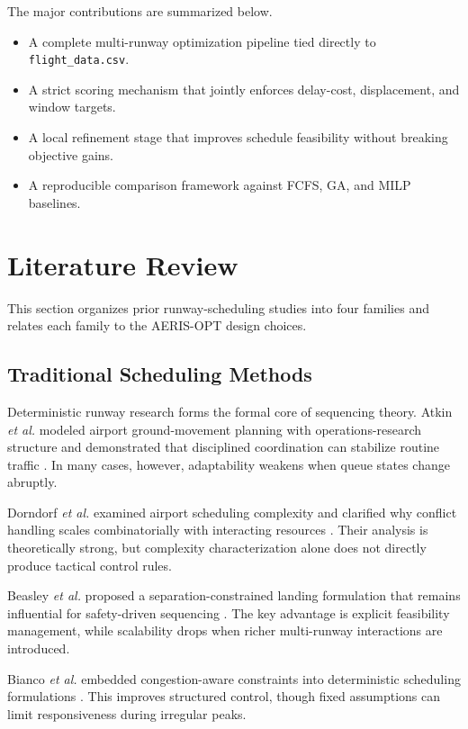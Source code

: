 \documentclass[conference]{IEEEtran}
\begin{document}
The major contributions are summarized below.
\begin{itemize}
    \item A complete multi-runway optimization pipeline tied directly to \texttt{flight\_data.csv}.
    \item A strict scoring mechanism that jointly enforces delay-cost, displacement, and window targets.
    \item A local refinement stage that improves schedule feasibility without breaking objective gains.
    \item A reproducible comparison framework against FCFS, GA, and MILP baselines.
\end{itemize}

\section{Literature Review}
This section organizes prior runway-scheduling studies into four families and relates each family to the AERIS-OPT design choices.

\subsection{Traditional Scheduling Methods}
Deterministic runway research forms the formal core of sequencing theory. Atkin \textit{et al.} modeled airport ground-movement planning with operations-research structure and demonstrated that disciplined coordination can stabilize routine traffic \cite{ref1}. In many cases, however, adaptability weakens when queue states change abruptly.

Dorndorf \textit{et al.} examined airport scheduling complexity and clarified why conflict handling scales combinatorially with interacting resources \cite{ref2}. Their analysis is theoretically strong, but complexity characterization alone does not directly produce tactical control rules.

Beasley \textit{et al.} proposed a separation-constrained landing formulation that remains influential for safety-driven sequencing \cite{ref3}. The key advantage is explicit feasibility management, while scalability drops when richer multi-runway interactions are introduced.

Bianco \textit{et al.} embedded congestion-aware constraints into deterministic scheduling formulations \cite{ref4}. This improves structured control, though fixed assumptions can limit responsiveness during irregular peaks.
\end{document}
